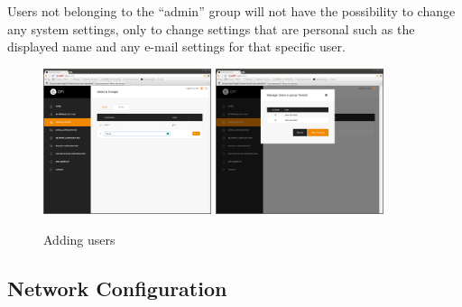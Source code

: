 \documentclass[12pt,a4paper,titlepage]{article}
\begin{document}
Users not belonging to the ``admin'' group will not have the possibility to change any system settings, only to change settings that are personal such as the displayed name and any e-mail settings for that specific user.
\begin{figure}[h!]
\centering
\includegraphics[width=4.93cm]{./img/groups-1}
\includegraphics[width=4.93cm]{./img/groups-2}
\caption{Adding users}
\end{figure}
\newpage
\subsection{Network Configuration}
\end{document}
